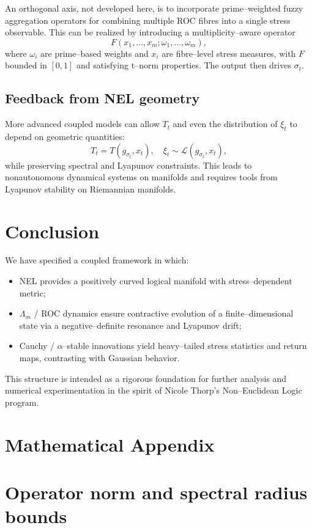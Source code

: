 \documentclass[11pt]{article}
\theoremstyle{plain}
\theoremstyle{definition}
\numberwithin{equation}{section}
\begin{document}
An orthogonal axis, not developed here, is to incorporate
prime--weighted fuzzy aggregation operators for combining multiple
ROC fibres into a single stress observable. This can be realized by
introducing a multiplicity--aware operator
\[
F(x_1,\dots,x_m; \omega_1,\dots,\omega_m),
\]
where $\omega_i$ are prime--based weights and
$x_i$ are fibre--level stress measures, with $F$ bounded in $[0,1]$
and satisfying t--norm properties. The output then drives $\sigma_t$.

\subsection{Feedback from NEL geometry}

More advanced coupled models can allow $T_t$ and even the distribution
of $\xi_t$ to depend on geometric quantities:
\[
T_t = T(g_{\sigma_t}, x_t), \quad
\xi_t \sim \mathcal{L}(g_{\sigma_t}, x_t),
\]
while preserving spectral and Lyapunov constraints. This leads to
nonautonomous dynamical systems on manifolds and requires tools from
Lyapunov stability on Riemannian manifolds.

\section{Conclusion}

We have specified a coupled framework in which:
\begin{itemize}
  \item NEL provides a positively curved logical manifold with
  stress--dependent metric;
  \item $\Lambda_m$ / ROC dynamics ensure contractive evolution of a
  finite--dimensional state via a negative--definite resonance and
  Lyapunov drift;
  \item Cauchy / $\alpha$--stable innovations yield heavy--tailed
  stress statistics and return maps, contrasting with Gaussian
  behavior.
\end{itemize}
This structure is intended as a rigorous foundation for further
analysis and numerical experimentation in the spirit of Nicole Thorp's
Non--Euclidean Logic program.

\appendix
\section*{Mathematical Appendix}

\section{Operator norm and spectral radius bounds}
\end{document}
